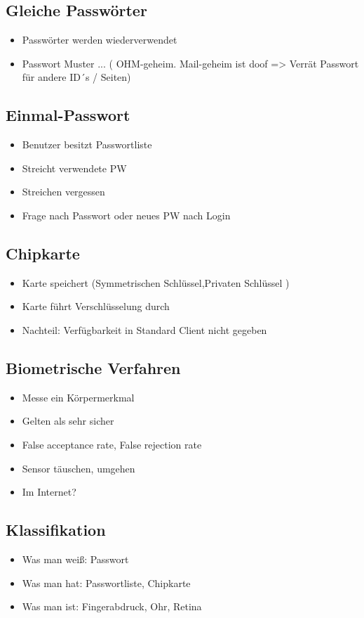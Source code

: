 {\subsection*{ Gleiche Passwörter}
\begin{itemize}
	\item Passwörter werden wiederverwendet
	\item Passwort Muster ... ( OHM-geheim. Mail-geheim ist doof => Verrät Passwort für andere ID´s / Seiten)
\end{itemize}

\subsection*{ Einmal-Passwort}
\begin{itemize}
	\item Benutzer besitzt Passwortliste
	\item Streicht verwendete PW
	\item Streichen vergessen
	\item  Frage nach Passwort oder neues PW nach Login
\end{itemize}

\subsection*{ Chipkarte}
\begin{itemize}
	\item Karte speichert (Symmetrischen Schlüssel,Privaten Schlüssel )
	\item Karte führt Verschlüsselung durch
	\item Nachteil: Verfügbarkeit in Standard Client nicht gegeben
\end{itemize}

\subsection*{ Biometrische Verfahren}
\begin{itemize}
	\item Messe ein Körpermerkmal
	\item Gelten als sehr sicher
	\item False acceptance rate, False rejection rate
	\item Sensor täuschen, umgehen
	\item Im Internet?
\end{itemize}

\subsection*{ Klassifikation}
\begin{itemize}
	\item Was man weiß: Passwort
	\item Was man hat: Passwortliste, Chipkarte
	\item Was man ist: Fingerabdruck, Ohr, Retina
\end{itemize}

}
